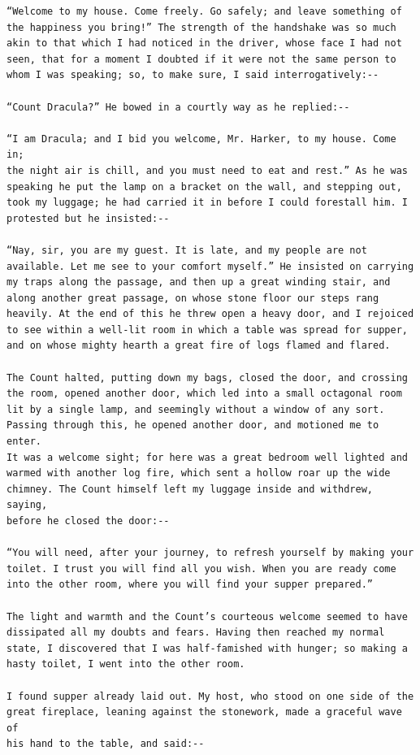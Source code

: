 \documentclass{article}
\begin{document}
\begin{verbatim}
“Welcome to my house. Come freely. Go safely; and leave something of
the happiness you bring!” The strength of the handshake was so much
akin to that which I had noticed in the driver, whose face I had not
seen, that for a moment I doubted if it were not the same person to
whom I was speaking; so, to make sure, I said interrogatively:--

“Count Dracula?” He bowed in a courtly way as he replied:--

“I am Dracula; and I bid you welcome, Mr. Harker, to my house. Come in;
the night air is chill, and you must need to eat and rest.” As he was
speaking he put the lamp on a bracket on the wall, and stepping out,
took my luggage; he had carried it in before I could forestall him. I
protested but he insisted:--

“Nay, sir, you are my guest. It is late, and my people are not
available. Let me see to your comfort myself.” He insisted on carrying
my traps along the passage, and then up a great winding stair, and
along another great passage, on whose stone floor our steps rang
heavily. At the end of this he threw open a heavy door, and I rejoiced
to see within a well-lit room in which a table was spread for supper,
and on whose mighty hearth a great fire of logs flamed and flared.

The Count halted, putting down my bags, closed the door, and crossing
the room, opened another door, which led into a small octagonal room
lit by a single lamp, and seemingly without a window of any sort.
Passing through this, he opened another door, and motioned me to enter.
It was a welcome sight; for here was a great bedroom well lighted and
warmed with another log fire, which sent a hollow roar up the wide
chimney. The Count himself left my luggage inside and withdrew, saying,
before he closed the door:--

“You will need, after your journey, to refresh yourself by making your
toilet. I trust you will find all you wish. When you are ready come
into the other room, where you will find your supper prepared.”

The light and warmth and the Count’s courteous welcome seemed to have
dissipated all my doubts and fears. Having then reached my normal
state, I discovered that I was half-famished with hunger; so making a
hasty toilet, I went into the other room.

I found supper already laid out. My host, who stood on one side of the
great fireplace, leaning against the stonework, made a graceful wave of
his hand to the table, and said:--


\end{verbatim}
\end{document}
